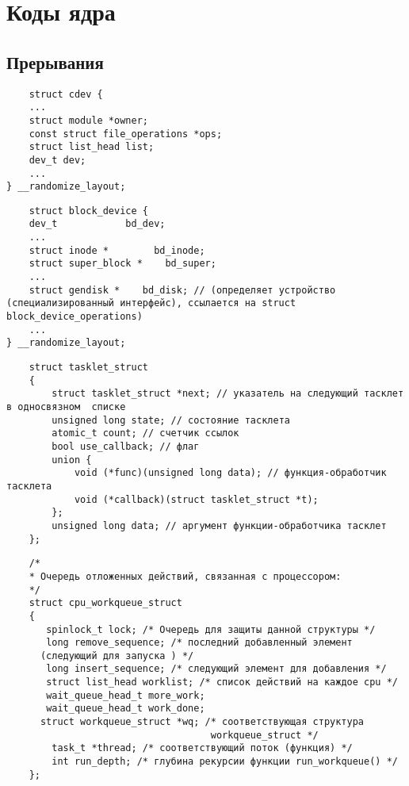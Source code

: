 \chapter{Коды ядра}

\section*{Прерывания}

\begin{lstlisting}
	struct cdev {
    ...
    struct module *owner;
    const struct file_operations *ops;
    struct list_head list;
    dev_t dev;
    ...
} __randomize_layout;
\end{lstlisting}

\begin{lstlisting}
	struct block_device {
    dev_t            bd_dev; 
    ...
    struct inode *        bd_inode; 
    struct super_block *    bd_super;
    ...
    struct gendisk *    bd_disk; // (определяет устройство (специализированный интерфейс), ссылается на struct block_device_operations)
    ...
} __randomize_layout;
\end{lstlisting}

\begin{lstlisting}
	struct tasklet_struct
	{
		struct tasklet_struct *next; // указатель на следующий тасклет в односвязном  списке
		unsigned long state; // состояние тасклета
		atomic_t count; // счетчик ссылок 
		bool use_callback; // флаг
		union {
			void (*func)(unsigned long data); // функция-обработчик тасклета
			void (*callback)(struct tasklet_struct *t);
		};
		unsigned long data; // аргумент функции-обработчика тасклет
	};
\end{lstlisting}

\begin{lstlisting}
	/*
	* Очередь отложенных действий, связанная с процессором:
	*/
	struct cpu_workqueue_struct 
	{
	   spinlock_t lock; /* Очередь для защиты данной структуры */
	   long remove_sequence; /* последний добавленный элемент
	  (следующий для запуска ) */
	   long insert_sequence; /* следующий элемент для добавления */
	   struct list_head worklist; /* список действий на каждое cpu */
	   wait_queue_head_t more_work;
	   wait_queue_head_t work_done;
	  struct workqueue_struct *wq; /* соответствующая структура
									workqueue_struct */
		task_t *thread; /* соответствующий поток (функция) */
		int run_depth; /* глубина рекурсии функции run_workqueue() */
	};
\end{lstlisting}

